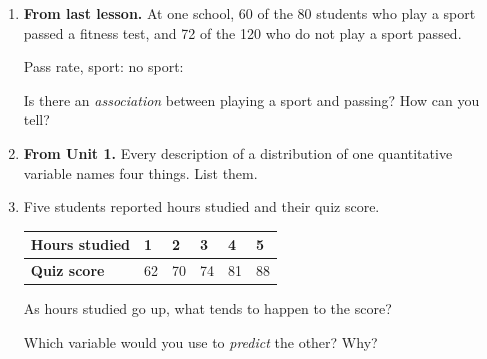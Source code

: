 \documentclass[12pt]{article}
\begin{document}

\vspace{0.28in}

\begin{enumerate}[leftmargin=1.9em, itemsep=0.75in]

  \item \textbf{From last lesson.} At one school, 60 of the 80 students who play a sport
        passed a fitness test, and 72 of the 120 who do not play a sport passed.

        \vspace{12pt}
        Pass rate, sport: \blank{2.4cm} \qquad no sport: \blank{2.4cm}
        \vspace{16pt}

        Is there an \emph{association} between playing a sport and passing? How can you
        tell?\\[18pt]

  \item \textbf{From Unit 1.} Every description of a distribution of one quantitative
        variable names four things. List them.

        \vspace{16pt}
        \blank{3.0cm} \quad \blank{3.0cm} \quad \blank{3.0cm} \quad
        \blank{3.6cm}

  \item Five students reported hours studied and their quiz score.

        \vspace{12pt}
        \renewcommand{\arraystretch}{1.5}
        \begin{tabularx}{\linewidth}{@{} l Y Y Y Y Y @{}}
        \textbf{Hours studied} & 1 & 2 & 3 & 4 & 5 \\
        \hline
        \textbf{Quiz score} & 62 & 70 & 74 & 81 & 88 \\
        \end{tabularx}

        \vspace{16pt}
        As hours studied go up, what tends to happen to the score? \blank{4.4cm}
        \vspace{16pt}

        Which variable would you use to \emph{predict} the other? Why?\\[18pt]

\end{enumerate}
\end{document}

